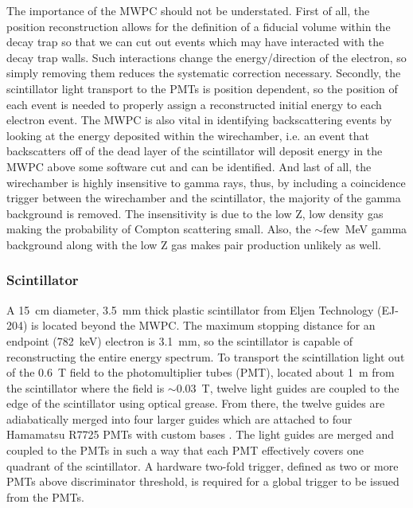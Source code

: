 The importance of the MWPC should not be understated. First of all, the position reconstruction allows for the
definition of a fiducial volume within the decay trap so that we can cut out events which may have interacted
with the decay trap walls. Such interactions change the energy/direction of the electron, so simply removing them
reduces the systematic correction necessary. Secondly, the scintillator light transport to the PMTs is position
dependent, so the position of each event is needed to properly assign a reconstructed initial energy to
each electron event. The MWPC is also vital in identifying backscattering events by looking at the energy
deposited within the wirechamber, i.e. an event that backscatters off of the dead layer of the scintillator
will deposit energy in the MWPC above some software cut and can be identified. And last of all,
the wirechamber is highly insensitive to gamma rays, thus, by including a coincidence trigger between the wirechamber
and the scintillator, the majority of the gamma background is removed. The insensitivity is due to
the low Z, low density gas making the probability of Compton
scattering small. Also, the $\sim$few~MeV gamma background along with the low Z gas makes pair production
unlikely as well.

\subsubsection{Scintillator}

A 15~cm diameter, 3.5~mm thick plastic scintillator \cite{plaster2012}
from Eljen Technology (EJ-204) is located beyond the
MWPC. The maximum stopping distance for an endpoint (782~keV) electron is 3.1~mm, so the
scintillator is capable of reconstructing the entire energy spectrum. To transport the
scintillation light out of the 0.6~T field to the photomultiplier tubes (PMT),
located about 1~m from the scintillator where the field is $\sim0.03$~T,
twelve light guides are coupled to the edge of the scintillator using optical grease.
From there, the twelve guides are adiabatically merged into four
larger guides which are attached to four Hamamatsu R7725 PMTs with custom bases \cite{hickerson2013}.
The light guides are merged and coupled to the PMTs in such a way that each PMT effectively
covers one quadrant of the scintillator.
A hardware two-fold trigger, defined as two or more PMTs above discriminator threshold, is required for a
global trigger to be issued from the PMTs.

